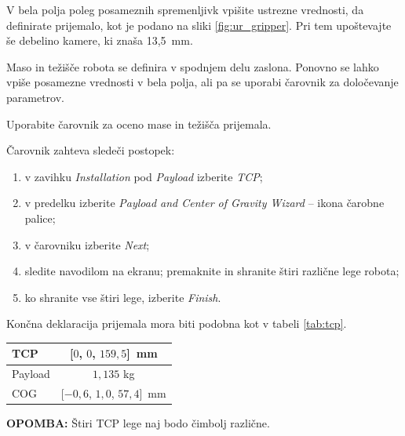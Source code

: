 \begin{mdframed}[backgroundcolor=yellow!20, shadow=true,roundcorner=8pt]
V bela polja poleg posameznih spremenljivk vpišite ustrezne vrednosti, da definirate prijemalo, kot je podano na sliki \ref{fig:ur_gripper}. Pri tem upoštevajte še debelino kamere, ki znaša 13,5~mm.
\end{mdframed}


Maso in težišče robota se definira v spodnjem delu zaslona. Ponovno se lahko vpiše posamezne vrednosti v bela polja, ali pa se uporabi čarovnik za določevanje parametrov.

\begin{mdframed}[backgroundcolor=yellow!20, shadow=true,roundcorner=8pt]
Uporabite čarovnik za oceno mase in težišča prijemala.
\end{mdframed}

Čarovnik zahteva sledeči postopek:
\begin{enumerate}
\item v zavihku \emph{Installation} pod \emph{Payload} izberite \emph{TCP};
\item v predelku izberite \emph{Payload and Center of Gravity Wizard} -- ikona čarobne palice;
\item v čarovniku izberite \emph{Next};
\item sledite navodilom na ekranu; premaknite in shranite štiri različne lege robota;
\item ko shranite vse štiri lege, izberite \emph{Finish}.
\end{enumerate}

Končna deklaracija prijemala mora biti podobna kot v tabeli \ref{tab:tcp}.

\begin{center}
\begin{tabular}{|l|c|}
  \hline
  TCP & [$0$, $0$, $159,5$]~mm \\
  \hline
  Payload & $1,135$ kg \\
  \hline
  COG & [$-0,6$, $1,0$, $57,4$]~mm\\
  \hline
\end{tabular}
\label{tab:tcp}
\end{center}

\begin{mdframed}[backgroundcolor=blue!20, shadow=true,roundcorner=8pt]
\textbf{OPOMBA:} Štiri TCP lege naj bodo čimbolj različne.
\end{mdframed}

